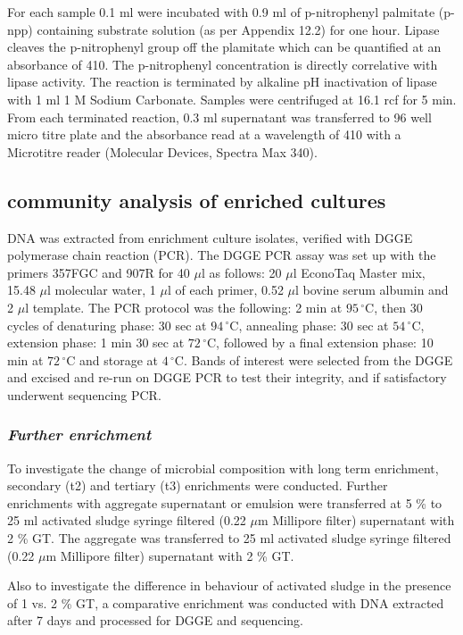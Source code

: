 \documentclass{article}
\begin{document}
For each sample 0.1 ml were incubated with 0.9 ml of  p-nitrophenyl palmitate (p-npp) containing substrate solution (as per Appendix 12.2) for one hour. Lipase cleaves the p-nitrophenyl group off the plamitate which can be quantified at an absorbance of 410. The p-nitrophenyl concentration is directly correlative with lipase activity. The reaction is terminated by alkaline pH inactivation of lipase with 1 ml 1 M Sodium Carbonate. Samples were centrifuged at 16.1 rcf for 5 min. From each terminated reaction, 0.3 ml supernatant was transferred to 96 well micro titre plate and the absorbance read at a wavelength of 410 with a Microtitre reader (Molecular Devices, Spectra Max 340).

\subsection{community analysis of enriched cultures}
DNA was extracted from enrichment culture isolates, verified with DGGE polymerase chain reaction (PCR). The DGGE PCR assay was set up with the primers 357FGC and 907R for 40 $\mu$l as follows: 20 $\mu$l EconoTaq Master mix, 15.48 $\mu$l molecular water, 1 $\mu$l of each primer, 0.52 $\mu$l bovine serum albumin and 2 $\mu$l template. The PCR protocol was the following: 2 min at $95\,^{\circ}\mathrm{C}$, then 30 cycles of denaturing phase: 30 sec at $94\,^{\circ}\mathrm{C}$, annealing phase: 30 sec at  $54\,^{\circ}\mathrm{C}$, extension phase: 1 min 30 sec at $72\,^{\circ}\mathrm{C}$, followed by a final extension phase: 10 min at $72\,^{\circ}\mathrm{C}$ and storage at $4\,^{\circ}\mathrm{C}$.
Bands of interest were selected from the DGGE and excised and re-run on DGGE PCR to test their integrity, and if satisfactory underwent sequencing PCR. 

\subsubsection{\emph{Further enrichment}}
To investigate the change of microbial composition with long term enrichment, secondary (t2) and tertiary (t3) enrichments were conducted. Further enrichments with aggregate supernatant or emulsion were transferred at 5 \% to 25 ml activated sludge syringe filtered (0.22 $\mu$m Millipore filter) supernatant with 2 \% GT. The aggregate was transferred to 25 ml activated sludge syringe filtered (0.22 $\mu$m Millipore filter) supernatant with 2 \% GT. 


Also to investigate the difference in behaviour of activated sludge in the presence of 1 vs. 2 \% GT, a comparative enrichment was conducted with DNA extracted after 7 days and processed for DGGE and sequencing.
 
\end{document}
